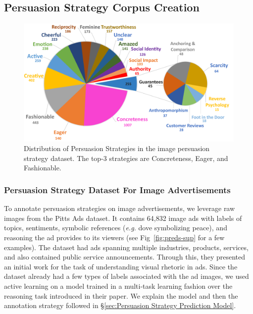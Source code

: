 

\subsection{Persuasion Strategy Corpus Creation}
\label{sec:Persuasion Strategy Corpus Creation}

\begin{figure}[t]
        \centering
        \includegraphics[scale=0.3]{images/pie_chart.pdf}
        \caption{Distribution of Persuasion Strategies in the image persuasion strategy dataset. The top-3 strategies are Concreteness, Eager, and Fashionable. \small}
        \label{fig:persuasion-strategies-distribution}
    \end{figure}


\subsubsection{Persuasion Strategy Dataset For Image Advertisements}

To annotate persuasion strategies on image advertisements, we leverage raw images from the Pitts Ads dataset. It contains 64,832 image ads with labels of topics, sentiments, symbolic references (\textit{e.g.} dove symbolizing peace), and reasoning the ad provides to its viewers (see Fig~\ref{fig:preds-sup} for a few examples). The dataset had ads spanning multiple industries, products, services, and also contained public service announcements. Through this, they presented an initial work for the task of understanding visual rhetoric in ads. Since the dataset already had a few types of labels associated with the ad images, we used active learning on a model trained in a multi-task learning fashion over the reasoning task introduced in their paper. We explain the model and then the annotation strategy followed in \S\ref{sec:Persuasion Strategy Prediction Model}. 







